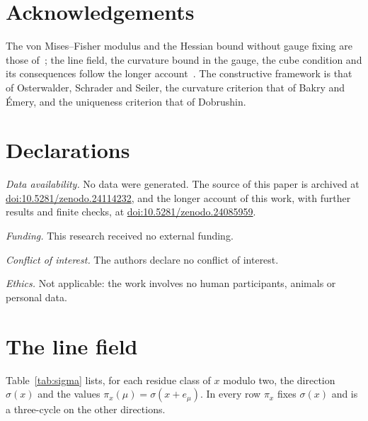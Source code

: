 \documentclass[11pt]{amsart}
\theoremstyle{definition}
\theoremstyle{remark}
\numberwithin{equation}{section}
\begin{document}
\section*{Acknowledgements}

The von Mises--Fisher modulus and the Hessian bound without gauge fixing are those
of~\cite{BB26a}; the line field, the curvature bound in the gauge, the cube
condition and its consequences follow the longer account~\cite{BBLR26,BBLRS26}.
The constructive framework is that of Osterwalder, Schrader and Seiler, the
curvature criterion that of Bakry and \'Emery, and the uniqueness criterion
that of Dobrushin.

\section*{Declarations}

\emph{Data availability.} No data were generated. The source of this paper is
archived at
\href{https://doi.org/10.5281/zenodo.24114232}{doi:10.5281/zenodo.24114232}, and
the longer account of this work, with further results and finite checks, at
\href{https://doi.org/10.5281/zenodo.24085959}{doi:10.5281/zenodo.24085959}.

\emph{Funding.} This research received no external funding.

\emph{Conflict of interest.} The authors declare no conflict of interest.

\emph{Ethics.} Not applicable: the work involves no human participants,
animals or personal data.

\appendix

\section{The line field}\label{app:table}

Table~\ref{tab:sigma} lists, for each residue class of $x$ modulo two, the
direction $\sigma(x)$ and the values $\pi_x(\mu)=\sigma(x+e_\mu)$. In every row
$\pi_x$ fixes $\sigma(x)$ and is a three-cycle on the other directions.
\end{document}
